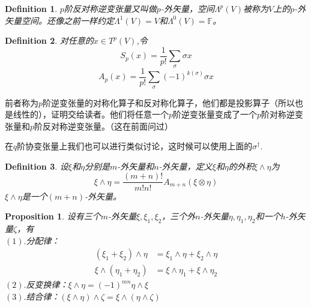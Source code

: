 \documentclass[11pt,a4paper,openany]{book}%
\theoremstyle{plain}%
\newtheorem{pro}{Proposition}[chapter]%
\newtheorem{defi}{Definition}[chapter]%
\begin{document}
\begin{defi}
$p$阶反对称逆变张量又叫做$p$-外矢量，空间$\Lambda^p(V)$被称为$V$上的$p$-外矢量空间。还像之前一样约定$\Lambda^1(V)=V$和$\Lambda^0(V)=\mathbb{F}$。
\end{defi}
\begin{defi}
对任意的$x\in T^p(V)$,令
\[
S_p(x)=\frac{1}{p!}\sum_{\sigma}\sigma x
\]
\[
A_p(x)=\frac{1}{p!}\sum_{\sigma}(-1)^{k(\sigma)}\sigma x
\]
\end{defi}
前者称为$p$阶逆变张量的对称化算子和反对称化算子，他们都是投影算子（所以也是线性的），证明交给读者。他们将任意一个$p$阶逆变张量变成了一个$p$阶对称逆变张量和$p$阶反对称逆变张量。（这在前面问过）

在$q$阶协变张量上我们也可以进行类似讨论，这时候可以使用上面的$\sigma^\dag$.
\begin{defi}
设$\xi$和$\eta$分别是$m$-外矢量和$n$-外矢量，定义$\xi$和$\eta$的外积$\xi \wedge \eta$为
\[
\xi \wedge \eta=\frac{(m+n)!}{m!n!}A_{m+n}(\xi \otimes \eta)
\]
$\xi \wedge \eta$是一个$(m+n)$-外矢量。
\end{defi}
\begin{pro}
设有三个$m$-外矢量$\xi,\xi_1,\xi_2$，三个外$n$-外矢量$\eta,\eta_1,\eta_2$和一个$h$-外矢量$\zeta$，有\\
$(1).$分配律：
\begin{equation*}
\begin{split}
(\xi_1+\xi_2)\wedge \eta&=\xi_1 \wedge \eta+\xi_2 \wedge \eta \\
\xi \wedge (\eta_1+\eta_2)&=\xi \wedge \eta_1+\xi \wedge \eta_2
\end{split}
\end{equation*}
$(2).$反变换律：$\xi \wedge \eta=(-1)^{mn}\eta \wedge \xi$\\
$(3).$结合律：$(\xi \wedge \eta)\wedge \zeta=\xi \wedge (\eta\wedge \zeta)$
\end{pro}
\end{document}
